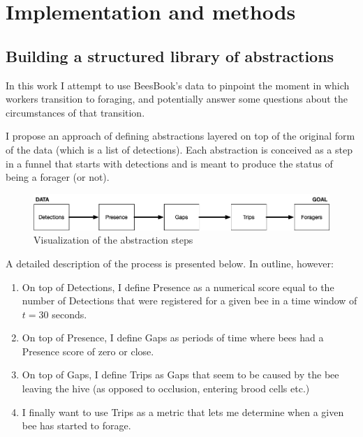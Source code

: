 
\chapter{Implementation and methods}  %

\ifpdf
    \graphicspath{{Chapters/Chapter3/Figs/Raster/}{Chapters/Chapter3/Figs/PDF/}{Chapters/Chapter3/Figs/}}
\else
    \graphicspath{{Chapters/Chapter3/Figs/Vector/}{Chapters/Chapter3/Figs/}}
\fi


\section{Building a structured library of abstractions}


In this work I attempt to use BeesBook’s data
to pinpoint the moment in which workers transition to foraging, and potentially
answer some questions about the circumstances of that transition. 

I propose an approach of defining abstractions layered on top of the original
form of the data (which is a list of detections). Each abstraction is conceived
as a step in a funnel that starts with detections and is meant to produce the
status of being a forager (or not).

\begin{figure}[htbp!] 
\centering    
\includegraphics[width=1.0\textwidth]{Chapters/Chapter3/Figs/Raster/basic-funnel.png}
\caption[basic-funnel]{Visualization of the abstraction steps}
\label{fig:basic_funnel}
\end{figure}


A detailed description of the process is presented below. In outline, however: 
\begin{enumerate}
   \item  On top of Detections, I define Presence as a numerical score equal to the
        number of Detections that were registered for a given bee in a time window of
        $t=30$ seconds.
   \item On top of Presence, I define Gaps as periods of time where bees
had a Presence score of zero or close.
    \item On top of Gaps, I define Trips as Gaps that
seem to be caused by the bee leaving the hive (as opposed to occlusion, entering
brood cells etc.)
    \item I finally want to use Trips as a metric that lets me determine when
a given bee has started to forage. 
\end{enumerate}

